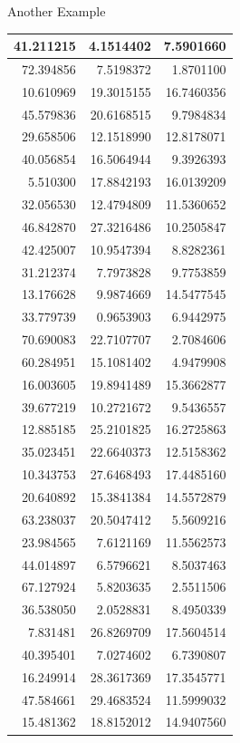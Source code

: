 \documentclass[
  ignorenonframetext,
]{beamer}
\begin{document}
\begin{frame}{Another Example}
\begin{table}
\begin{tabular}[t]{r|r|r}
\hline
41.211215 & 4.1514402 & 7.5901660\\
\hline
72.394856 & 7.5198372 & 1.8701100\\
\hline
10.610969 & 19.3015155 & 16.7460356\\
\hline
45.579836 & 20.6168515 & 9.7984834\\
\hline
29.658506 & 12.1518990 & 12.8178071\\
\hline
40.056854 & 16.5064944 & 9.3926393\\
\hline
5.510300 & 17.8842193 & 16.0139209\\
\hline
32.056530 & 12.4794809 & 11.5360652\\
\hline
46.842870 & 27.3216486 & 10.2505847\\
\hline
42.425007 & 10.9547394 & 8.8282361\\
\hline
31.212374 & 7.7973828 & 9.7753859\\
\hline
13.176628 & 9.9874669 & 14.5477545\\
\hline
33.779739 & 0.9653903 & 6.9442975\\
\hline
70.690083 & 22.7107707 & 2.7084606\\
\hline
60.284951 & 15.1081402 & 4.9479908\\
\hline
16.003605 & 19.8941489 & 15.3662877\\
\hline
39.677219 & 10.2721672 & 9.5436557\\
\hline
12.885185 & 25.2101825 & 16.2725863\\
\hline
35.023451 & 22.6640373 & 12.5158362\\
\hline
10.343753 & 27.6468493 & 17.4485160\\
\hline
20.640892 & 15.3841384 & 14.5572879\\
\hline
63.238037 & 20.5047412 & 5.5609216\\
\hline
23.984565 & 7.6121169 & 11.5562573\\
\hline
44.014897 & 6.5796621 & 8.5037463\\
\hline
67.127924 & 5.8203635 & 2.5511506\\
\hline
36.538050 & 2.0528831 & 8.4950339\\
\hline
7.831481 & 26.8269709 & 17.5604514\\
\hline
40.395401 & 7.0274602 & 6.7390807\\
\hline
16.249914 & 28.3617369 & 17.3545771\\
\hline
47.584661 & 29.4683524 & 11.5999032\\
\hline
15.481362 & 18.8152012 & 14.9407560\\

\end{tabular}
\end{table}
\end{frame}
\end{document}

